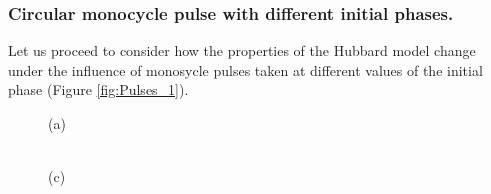 \clearpage





\subsubsection{Circular monocycle pulse with different initial phases.}

Let us proceed to consider how the properties of the Hubbard model change under the influence of monosycle pulses taken at different values of the initial phase (Figure \ref{fig:Pulses_1}).

\begin{figure}[h!]
\begin{minipage}[h]{0.5\linewidth}
 (a) \\
\end{minipage}
\hfill
\begin{minipage}[h]{0.5\linewidth}
 \\(c)

\end{minipage}
\end{figure}
